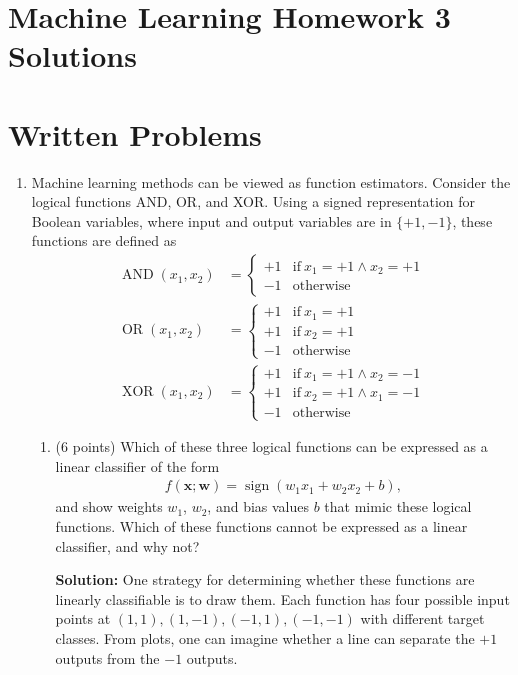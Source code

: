 \documentclass[10pt]{article}
\newcommand{\bx}{{\boldsymbol x}}
\newcommand{\bw}{{\boldsymbol w}}
\DeclareMathOperator*{\AND}{AND}
\DeclareMathOperator*{\OR}{OR}
\DeclareMathOperator*{\XOR}{XOR}
\DeclareMathOperator*{\sign}{sign}
\newcommand{\solution}[1]{{\color{PineGreen} \textbf{Solution:} #1}}
\begin{document}
\section*{Machine Learning Homework 3 Solutions}

\section*{Written Problems}

\begin{enumerate}

\item Machine learning methods can be viewed as function estimators. Consider the logical functions AND, OR, and XOR. Using a signed representation for Boolean variables, where input and output variables are in $\{+1, -1\}$, these functions are defined as
\begin{align}
\AND(x_1, x_2) &= \begin{cases}
+1 & \textrm{if}~ x_1 = +1 \wedge x_2 = +1\\
-1 & \textrm{otherwise}
\end{cases}\\
\OR(x_1, x_2) &= \begin{cases}
+1 & \textrm{if}~ x_1 = +1\\
+1 & \textrm{if}~ x_2 = +1\\
-1 & \textrm{otherwise}
\end{cases}\\
\XOR(x_1, x_2) &= \begin{cases}
+1 & \textrm{if}~ x_1 = +1 \wedge x_2 = -1\\
+1 & \textrm{if}~ x_2 = +1 \wedge x_1 = -1\\
-1 & \textrm{otherwise}
\end{cases}
\end{align}

\begin{enumerate}

\item (6 points) Which of these three logical functions can be expressed as a linear classifier of the form
\begin{align}
f(\bx; \bw) = \sign(w_1 x_1 + w_2 x_2 + b),
\end{align}
and show weights $w_1$, $w_2$, and bias values $b$ that mimic these logical functions. Which of these functions cannot be expressed as a linear classifier, and why not?

\solution{
One strategy for determining whether these functions are linearly classifiable is to draw them. Each function has four possible input points at $(1,1), (1, -1), (-1, 1), (-1, -1)$ with different target classes. From plots, one can imagine whether a line can separate the $+1$ outputs from the $-1$ outputs.

}
\end{enumerate}
\end{enumerate}
\end{document}
